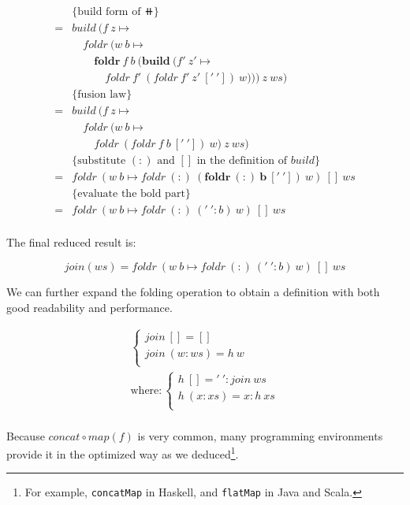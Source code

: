 \documentclass{article}
\begin{document}
\begin{example}
\[\begin{array}{rl}
  & \{\text{build form of } \doubleplus \} \\
= & build\ (f\ z \mapsto \\
  & \quad foldr\ (w\ b \mapsto \\
  & \quad \quad \pmb{foldr}\ f\ b\ (\pmb{build}\ (f'\ z' \mapsto \\
  & \quad \quad \quad foldr\ f'\ (foldr\ f'\ z'\ ['\ '])\ w)))\ z\ ws) \\

  & \{\text{fusion law}\} \\
= & build\ (f\ z \mapsto \\
  & \quad foldr\ (w\ b \mapsto \\
  & \quad \quad foldr\ (foldr\ f\ b\ ['\ '])\ w)\ z\ ws) \\

  & \{\text{substitute $(:)$ and $[]$ in the definition of $build$}\} \\
= & foldr\ (w\ b \mapsto foldr\ (:)\ \pmb{(foldr\ (:)\ b\ ['\ '])}\ w)\ []\ ws \\

  & \{\text{evaluate the bold part}\} \\
= & foldr\ (w\ b \mapsto foldr\ (:)\ ('\ ' : b)\ w)\ []\ ws \\
\end{array} \]

The final reduced result is:

\[
join(ws) = foldr\ (w\ b \mapsto foldr\ (:)\ ('\ ' : b)\ w)\ []\ ws
\]

We can further expand the folding operation to obtain a definition with both good readability and performance.

\[
\begin{array}{l}
\begin{cases}
join\ [] = [] \\
join\ (w:ws) = h\ w \\
\end{cases} \\
\text{where}: \begin{cases}
             h\ [] = '\ ' : join\ ws \\
             h\ (x:xs) = x : h\ xs \\
             \end{cases} \\
\end{array}
\]

 
Because $concat \circ map(f)$ is very common, many programming environments provide it in the optimized way as we deduced\footnote{For example, \texttt{concatMap} in Haskell, and \texttt{flatMap} in Java and Scala.}.
\end{example}
\end{document}
